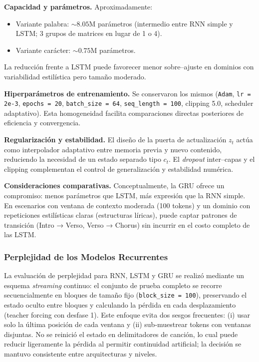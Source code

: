 \documentclass[paper=letter, fontsize=11pt, draft=false]{scrartcl}
\numberwithin{equation}{section} %
\numberwithin{figure}{section} %
\numberwithin{table}{section} %
\numberwithin{subsection}{section}
\begin{document}
\textbf{Capacidad y parámetros.} Aproximadamente:
\begin{itemize}
    \item Variante palabra: $\sim 8.05$M parámetros (intermedio entre RNN simple y LSTM; 3 grupos de matrices en lugar de 1 o 4).
    \item Variante carácter: $\sim 0.75$M parámetros.
\end{itemize}
La reducción frente a LSTM puede favorecer menor sobre–ajuste en dominios con variabilidad estilística pero tamaño moderado.

\textbf{Hiperparámetros de entrenamiento.} Se conservaron los mismos (\texttt{Adam}, \texttt{lr = 2e-3}, \texttt{epochs = 20}, \texttt{batch\_size = 64}, \texttt{seq\_length = 100}, clipping 5.0, scheduler adaptativo). Esta homogeneidad facilita comparaciones directas posteriores de eficiencia y convergencia.

\textbf{Regularización y estabilidad.} El diseño de la puerta de actualización $z_t$ actúa como interpolador adaptativo entre memoria previa y nuevo contenido, reduciendo la necesidad de un estado separado tipo $c_t$. El \emph{dropout} inter–capas y el clipping complementan el control de generalización y estabilidad numérica.

\textbf{Consideraciones comparativas.} Conceptualmente, la GRU ofrece un compromiso: menos parámetros que LSTM, más expresión que la RNN simple. En escenarios con ventana de contexto moderada (100 tokens) y un dominio con repeticiones estilísticas claras (estructuras líricas), puede captar patrones de transición (Intro → Verso, Verso → Chorus) sin incurrir en el costo completo de las LSTM.


\subsubsection{Perplejidad de los Modelos Recurrentes}
La evaluación de perplejidad para RNN, LSTM y GRU se realizó mediante un esquema \emph{streaming} continuo: el conjunto de prueba completo se recorre secuencialmente en bloques de tamaño fijo (\texttt{block\_size = 100}), preservando el estado oculto entre bloques y calculando la pérdida en cada desplazamiento (teacher forcing con desfase 1). Este enfoque evita dos sesgos frecuentes: (i) usar solo la última posición de cada ventana y (ii) sub-muestrear tokens con ventanas disjuntas. No se reinició el estado en delimitadores de canción, lo cual puede reducir ligeramente la pérdida al permitir continuidad artificial; la decisión se mantuvo consistente entre arquitecturas y niveles.
\end{document}
